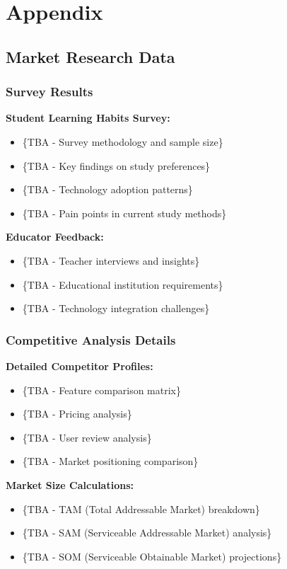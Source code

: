 \section{Appendix}

\subsection{Market Research Data}
\subsubsection{Survey Results}
\textbf{Student Learning Habits Survey:}
\begin{itemize}
    \item \{TBA - Survey methodology and sample size\}
    \item \{TBA - Key findings on study preferences\}
    \item \{TBA - Technology adoption patterns\}
    \item \{TBA - Pain points in current study methods\}
\end{itemize}

\textbf{Educator Feedback:}
\begin{itemize}
    \item \{TBA - Teacher interviews and insights\}
    \item \{TBA - Educational institution requirements\}
    \item \{TBA - Technology integration challenges\}
\end{itemize}

\subsubsection{Competitive Analysis Details}
\textbf{Detailed Competitor Profiles:}
\begin{itemize}
    \item \{TBA - Feature comparison matrix\}
    \item \{TBA - Pricing analysis\}
    \item \{TBA - User review analysis\}
    \item \{TBA - Market positioning comparison\}
\end{itemize}

\textbf{Market Size Calculations:}
\begin{itemize}
    \item \{TBA - TAM (Total Addressable Market) breakdown\}
    \item \{TBA - SAM (Serviceable Addressable Market) analysis\}
    \item \{TBA - SOM (Serviceable Obtainable Market) projections\}
\end{itemize}

